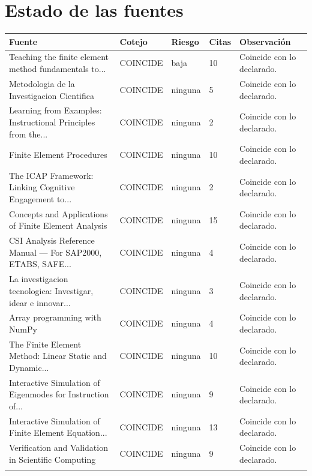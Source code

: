 \documentclass[11pt,a4paper]{article}
\begin{document}
\section{Estado de las fuentes}
\begin{longtable}{@{}p{4.6cm}p{2.1cm}p{1.5cm}p{1.3cm}p{5.4cm}@{}}
\toprule \textbf{Fuente} & \textbf{Cotejo} & \textbf{Riesgo} & \textbf{Citas} & \textbf{Observación} \\ \midrule \endhead
Teaching the finite element method fundamentals to... & COINCIDE & baja & 10 & Coincide con lo declarado. \\ \addlinespace[2pt]
Metodologia de la Investigacion Cientifica & COINCIDE & ninguna & 5 & Coincide con lo declarado. \\ \addlinespace[2pt]
Learning from Examples: Instructional Principles from the... & COINCIDE & ninguna & 2 & Coincide con lo declarado. \\ \addlinespace[2pt]
Finite Element Procedures & COINCIDE & ninguna & 10 & Coincide con lo declarado. \\ \addlinespace[2pt]
The ICAP Framework: Linking Cognitive Engagement to... & COINCIDE & ninguna & 2 & Coincide con lo declarado. \\ \addlinespace[2pt]
Concepts and Applications of Finite Element Analysis & COINCIDE & ninguna & 15 & Coincide con lo declarado. \\ \addlinespace[2pt]
CSI Analysis Reference Manual --- For SAP2000, ETABS, SAFE... & COINCIDE & ninguna & 4 & Coincide con lo declarado. \\ \addlinespace[2pt]
La investigacion tecnologica: Investigar, idear e innovar... & COINCIDE & ninguna & 3 & Coincide con lo declarado. \\ \addlinespace[2pt]
Array programming with NumPy & COINCIDE & ninguna & 4 & Coincide con lo declarado. \\ \addlinespace[2pt]
The Finite Element Method: Linear Static and Dynamic... & COINCIDE & ninguna & 10 & Coincide con lo declarado. \\ \addlinespace[2pt]
Interactive Simulation of Eigenmodes for Instruction of... & COINCIDE & ninguna & 9 & Coincide con lo declarado. \\ \addlinespace[2pt]
Interactive Simulation of Finite Element Equation... & COINCIDE & ninguna & 13 & Coincide con lo declarado. \\ \addlinespace[2pt]
Verification and Validation in Scientific Computing & COINCIDE & ninguna & 9 & Coincide con lo declarado. \\ \addlinespace[2pt]

\end{longtable}
\end{document}
